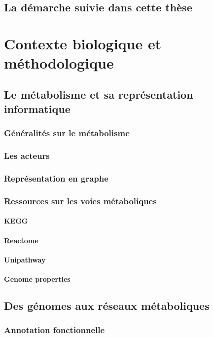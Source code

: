 \section*{La démarche suivie dans cette thèse}

\chapter{Contexte biologique et méthodologique }

\section{Le métabolisme et sa représentation informatique}
\subsection{Généralités sur le métabolisme}
\subsection{Les acteurs}
\subsection{Représentation en graphe}
\subsection{Ressources sur les voies métaboliques}
\subsubsection{KEGG}
\subsubsection{Reactome}
\subsubsection{Unipathway}
\subsubsection{Genome properties}

\section{Des génomes aux réseaux métaboliques}
\subsection{Annotation fonctionnelle}
